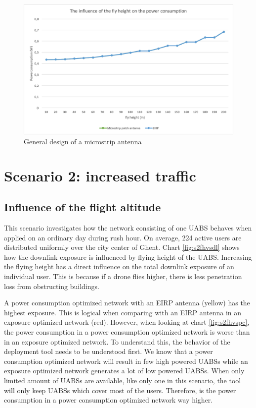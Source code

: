 \begin{figure}[bh!]
  \includegraphics[width=\textwidth]{../results/s1/flyheight-pc.png}
  \caption{General design of a microstrip antenna}
  \label{fig:pcsar}
\end{figure}



\section{Scenario 2: increased traffic}

\subsection{Influence of the flight altitude}
This scenario investigates how the network consisting of one \gls{UABS} behaves when applied on an ordinary day during rush hour. 
On average, 224 active users are distributed uniformly over the city center of Ghent. 
Chart \ref{fig:s2fhvsdl} shows how the downlink exposure is influenced by flying height of the \gls{UABS}. 
Increasing the flying height has a direct influence on the total downlink exposure of an individual user. 
This is because if a drone flies higher, there is less penetration loss from obstructing buildings.

A power consumption optimized network with an \gls{EIRP} antenna (yellow) has the highest exposure. 
This is logical when comparing with an EIRP antenna in an exposure optimized network (red). 
However, when looking at chart \ref{fig:s2fhvspc}, the power consumption in a power consumption optimized network is worse 
than in an exposure optimized network. To understand this, the behavior of the deployment tool needs to be understood first. 
We know that a power consumption optimized network will result in few high powered \gls{UABS}s while an exposure optimized network 
generates a lot of low powered \gls{UABS}s. When only limited amount of \gls{UABS}s are available, 
like only one in this scenario, the tool will only keep \gls{UABS}s which cover most of the users. 
Therefore, is the power consumption in a power consumption optimized network way higher. 

